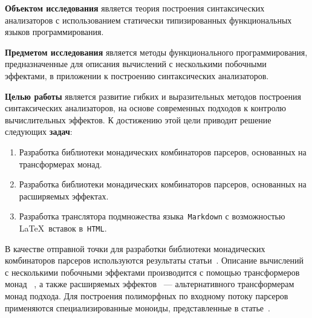 \textbf{Объектом исследования} является теория построения синтаксических анализаторов 
с использованием статически типизированных функциональных языков программирования.  

\textbf{Предметом исследования} является методы функционального программирования, 
предназначенные для описания вычислений с несколькими побочными эффектами, 
в приложении к построению синтаксических анализаторов.  

\textbf{Целью работы} является развитие гибких и выразительных методов построения 
синтаксических анализаторов, на основе современных подходов к контролю вычислительных
эффектов.
К достижению этой цели приводит решение следующих \textbf{задач}:
\begin{enumerate}
  \item Разработка библиотеки монадических комбинаторов парсеров, основанных на 
  трансформерах монад.
  \item Разработка библиотеки монадических комбинаторов парсеров, основанных на 
  расширяемых эффектах.
  \item Разработка транслятора подмножества языка~\lstinline{Markdown} с возможностью
  \LaTeX~вставок в~\lstinline{HTML}.
\end{enumerate}  

В качестве отправной точки для разработки библиотеки монадических комбинаторов
парсеров используются результаты статьи~\cite{monParsing}. Описание вычислений
с несколькими побочными эффектами производится с помощью трансформеров монад
~\cite{monadTransformers}, а также расширяемых эффектов~\cite{extEffects} ---
альтернативного трансформерам монад подхода. Для построения полиморфных по
входному потоку парсеров применяются специализированные моноиды, представленные
в статье~\cite{monoids}.
